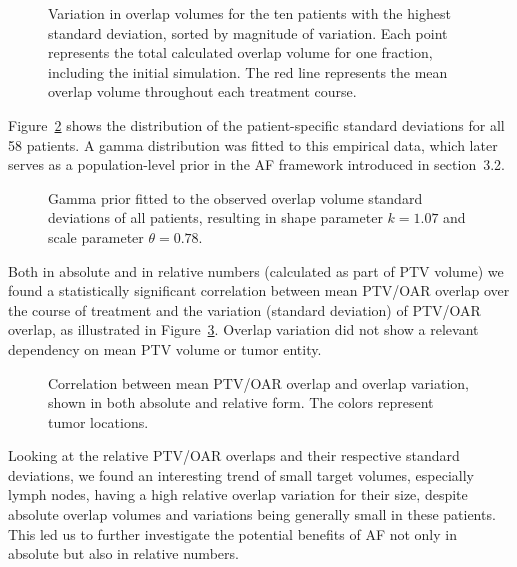 \documentclass[11pt]{article}
\begin{document}
\begin{figure}[ht]
\centering
{}
\caption{Variation in overlap volumes for the ten patients with the highest standard deviation, sorted by magnitude of variation. Each point represents the total calculated overlap volume for one fraction, including the initial simulation. The red line represents the mean overlap volume throughout each treatment course.}
\label{fig:top-overlap-variation}
\end{figure}

Figure~\ref{fig:gamma-prior-2025} shows the distribution of the patient-specific standard deviations for all 58 patients. A gamma distribution was fitted to this empirical data, which later serves as a population-level prior in the AF framework introduced in section~3.2.

\begin{figure}[ht]
\centering
{}
\caption{Gamma prior fitted to the observed overlap volume standard deviations of all patients, resulting in shape parameter $k = 1.07$ and scale parameter $\theta = 0.78$.}
\label{fig:gamma-prior-2025}
\end{figure}

Both in absolute and in relative numbers (calculated as part of PTV volume) we found a statistically significant correlation between mean PTV/OAR overlap over the course of treatment and the variation (standard deviation) of PTV/OAR overlap, as illustrated in Figure~\ref{fig:overlap-correlation}. Overlap variation did not show a relevant dependency on mean PTV volume or tumor entity.

\begin{figure}[ht]
\centering
{}
\caption{Correlation between mean PTV/OAR overlap and overlap variation, shown in both absolute and relative form. The colors represent tumor locations.}
\label{fig:overlap-correlation}
\end{figure}

Looking at the relative PTV/OAR overlaps and their respective standard deviations, we found an interesting trend of small target volumes, especially lymph nodes, having a high relative overlap variation for their size, despite absolute overlap volumes and variations being generally small in these patients. This led us to further investigate the potential benefits of AF not only in absolute but also in relative numbers.
\end{document}

